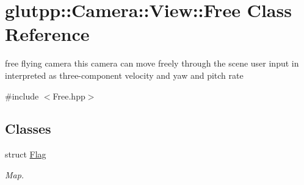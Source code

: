 \hypertarget{classglutpp_1_1Camera_1_1View_1_1Free}{\section{glutpp\-:\-:\-Camera\-:\-:\-View\-:\-:\-Free \-Class \-Reference}
\label{classglutpp_1_1Camera_1_1View_1_1Free}
}


free flying camera this camera can move freely through the scene user input in interpreted as three-\/component velocity and yaw and pitch rate  




{\ttfamily \#include $<$\-Free.\-hpp$>$}

\subsection*{\-Classes}
\begin{DoxyCompactItemize}
\item 
struct \hyperlink{structglutpp_1_1Camera_1_1View_1_1Free_1_1Flag}{\-Flag}
\begin{DoxyCompactList}\small\item\em \-Map. \end{DoxyCompactList}\end{DoxyCompactItemize}
